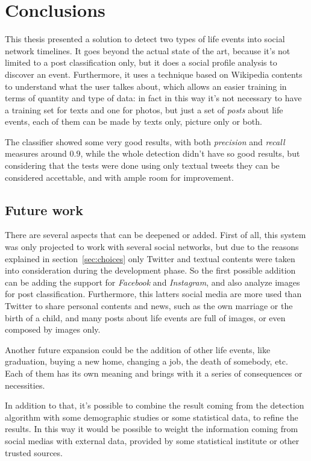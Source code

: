 \chapter{Conclusions}
\label{cha:conclusions}
This thesis presented a solution to detect two types of life events into social network timelines. It goes beyond the actual state of the art, because it's not limited to a post classification only, but it does a social profile analysis to discover an event. Furthermore, it uses a technique based on Wikipedia contents to understand what the user talkes about, which allows an easier training in terms of quantity and type of data: in fact in this way it's not necessary to have a training set for texts and one for photos, but just a set of \emph{posts} about life events, each of them can be made by texts only, picture only or both.

The classifier showed some very good results, with both \emph{precision} and \emph{recall} measures around $0.9$, while the whole detection didn't have so good results, but considering that the tests were done using only textual tweets they can be considered accettable, and with ample room for improvement.

\section{Future work}
\label{sec:futurework}
There are several aspects that can be deepened or added. First of all, this system was only projected to work with several social networks, but due to the reasons explained in section~\ref{sec:choices} only Twitter and textual contents were taken into consideration during the development phase. So the first possible addition can be adding the support for \emph{Facebook} and \emph{Instagram}, and also analyze images for post classification. Furthermore, this latters social media are more used than Twitter to share personal contents and news, such as the own marriage or the birth of a child, and many posts about life events are full of images, or even composed by images only.

Another future expansion could be the addition of other life events, like graduation, buying a new home, changing a job, the death of somebody, etc. Each of them has its own meaning and brings with it a series of consequences or necessities.

In addition to that, it's possible to combine the result coming from the detection algorithm with some demographic studies or some statistical data, to refine the results. In this way it would be possible to weight the information coming from social medias with external data, provided by some statistical institute or other trusted sources.


